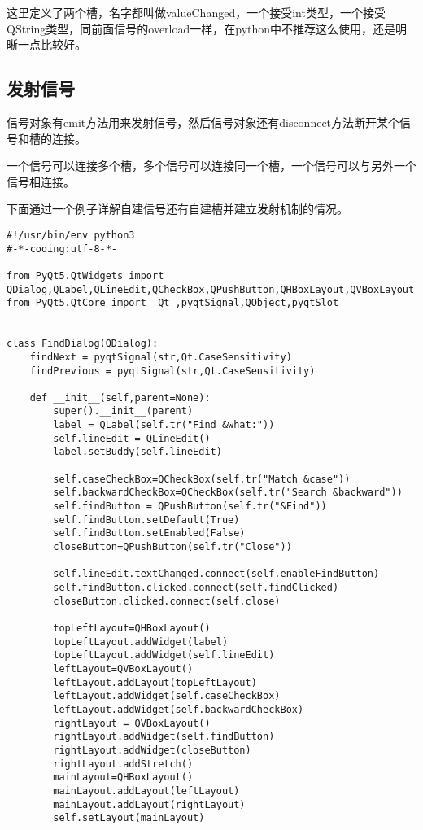 \documentclass[11pt,oneside]{article}
\begin{document}
这里定义了两个槽，名字都叫做valueChanged，一个接受int类型，一个接受QString类型，同前面信号的overload一样，在python中不推荐这么使用，还是明晰一点比较好。

\subsection{发射信号}
\label{sec:orgheadline20}
信号对象有emit方法用来发射信号，然后信号对象还有disconnect方法断开某个信号和槽的连接。

一个信号可以连接多个槽，多个信号可以连接同一个槽，一个信号可以与另外一个信号相连接。

下面通过一个例子详解自建信号还有自建槽并建立发射机制的情况。

\begin{verbatim}
#!/usr/bin/env python3
#-*-coding:utf-8-*-

from PyQt5.QtWidgets import QDialog,QLabel,QLineEdit,QCheckBox,QPushButton,QHBoxLayout,QVBoxLayout,QApplication
from PyQt5.QtCore import  Qt ,pyqtSignal,QObject,pyqtSlot


class FindDialog(QDialog):
    findNext = pyqtSignal(str,Qt.CaseSensitivity)
    findPrevious = pyqtSignal(str,Qt.CaseSensitivity)

    def __init__(self,parent=None):
        super().__init__(parent)
        label = QLabel(self.tr("Find &what:"))
        self.lineEdit = QLineEdit()
        label.setBuddy(self.lineEdit)

        self.caseCheckBox=QCheckBox(self.tr("Match &case"))
        self.backwardCheckBox=QCheckBox(self.tr("Search &backward"))
        self.findButton = QPushButton(self.tr("&Find"))
        self.findButton.setDefault(True)
        self.findButton.setEnabled(False)
        closeButton=QPushButton(self.tr("Close"))

        self.lineEdit.textChanged.connect(self.enableFindButton)
        self.findButton.clicked.connect(self.findClicked)
        closeButton.clicked.connect(self.close)

        topLeftLayout=QHBoxLayout()
        topLeftLayout.addWidget(label)
        topLeftLayout.addWidget(self.lineEdit)
        leftLayout=QVBoxLayout()
        leftLayout.addLayout(topLeftLayout)
        leftLayout.addWidget(self.caseCheckBox)
        leftLayout.addWidget(self.backwardCheckBox)
        rightLayout = QVBoxLayout()
        rightLayout.addWidget(self.findButton)
        rightLayout.addWidget(closeButton)
        rightLayout.addStretch()
        mainLayout=QHBoxLayout()
        mainLayout.addLayout(leftLayout)
        mainLayout.addLayout(rightLayout)
        self.setLayout(mainLayout)


\end{verbatim}
\end{document}
